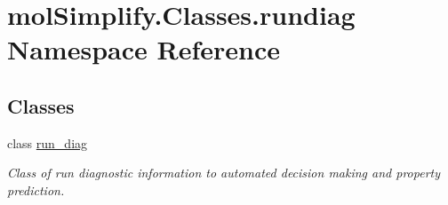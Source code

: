 \hypertarget{namespacemolSimplify_1_1Classes_1_1rundiag}{}\section{mol\+Simplify.\+Classes.\+rundiag Namespace Reference}
\label{namespacemolSimplify_1_1Classes_1_1rundiag}
\subsection*{Classes}
\begin{DoxyCompactItemize}
\item 
class \hyperlink{classmolSimplify_1_1Classes_1_1rundiag_1_1run__diag}{run\+\_\+diag}
\begin{DoxyCompactList}\small\item\em Class of run diagnostic information to automated decision making and property prediction. \end{DoxyCompactList}\end{DoxyCompactItemize}
